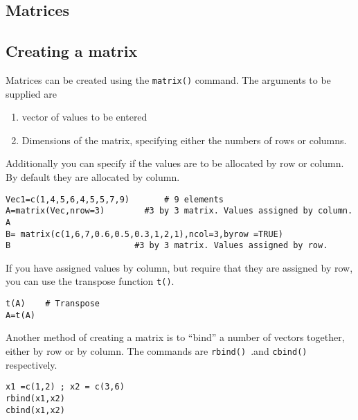 \documentclass[a4paper,12pt]{article}
\begin{document}
\begin{itemize}
\begin{itemize}
\section{Matrices}
\subsection{Creating a matrix}

Matrices can be created using the \texttt{matrix()} command. The arguments to be supplied are 
\begin{enumerate}
\item vector of values to be entered
\item  Dimensions of the matrix, specifying either the numbers of rows or columns.
\end{enumerate}

Additionally you can specify if the values are to be allocated by row or column. By default they are allocated by column.

\begin{framed}
\begin{verbatim}
Vec1=c(1,4,5,6,4,5,5,7,9)		# 9 elements
A=matrix(Vec,nrow=3)		#3 by 3 matrix. Values assigned by column.
A
B= matrix(c(1,6,7,0.6,0.5,0.3,1,2,1),ncol=3,byrow =TRUE)
B				          #3 by 3 matrix. Values assigned by row.
\end{verbatim}
\end{framed}


	
If you have assigned values by column, but require that they are assigned by row, you can use the transpose function \texttt{t()}.
\begin{framed}
\begin{verbatim}
t(A)	# Transpose
A=t(A)	
\end{verbatim}
\end{framed}

Another method of creating a matrix is to “bind” a number of vectors together, either by row or by column. The commands are \texttt{rbind() }.and \texttt{cbind()} respectively.


\begin{framed}
\begin{verbatim}
x1 =c(1,2) ; x2 = c(3,6)
rbind(x1,x2)
cbind(x1,x2)
\end{verbatim}
\end{framed}


\end{itemize}
\end{itemize}
\end{document}
